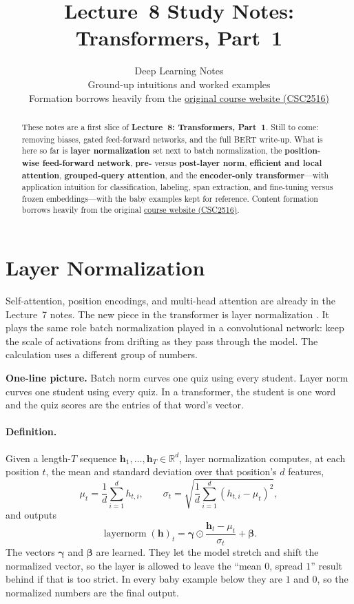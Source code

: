\documentclass[11pt]{article}
\title{Lecture~8 Study Notes:\\Transformers, Part~1}
\author{Deep Learning Notes\\
\small Ground-up intuitions and worked examples\\[0.35em]
\small Formation borrows heavily from the
\href{https://r-three.github.io/deep-learning-lecture-notes/lectures/08-transformers-part-1.html}{original course website (CSC2516)}}
\date{}
\begin{document}
\maketitle

\begin{abstract}
These notes are a first slice of \textbf{Lecture~8: Transformers, Part~1}.
Still to come: removing biases, gated feed-forward networks, and the full
BERT write-up. What is here so far is \textbf{layer normalization} set next
to batch normalization, the \textbf{position-wise feed-forward network},
\textbf{pre-} versus \textbf{post-layer norm}, \textbf{efficient and local
attention}, \textbf{grouped-query attention}, and the \textbf{encoder-only
transformer}---with application intuition for classification, labeling,
span extraction, and fine-tuning versus frozen embeddings---with the baby
examples kept for reference. Content formation borrows heavily
from the original
\href{https://r-three.github.io/deep-learning-lecture-notes/}{course website
(CSC2516)}.
\end{abstract}

\tableofcontents
\vspace{1em}

\section{Layer Normalization}

Self-attention, position encodings, and multi-head attention are already in
the Lecture~7 notes. The new piece in the transformer is layer
normalization \cite{ba2016layer}. It plays the same role batch normalization
played in a convolutional network: keep the scale of activations from
drifting as they pass through the model. The calculation uses a different
group of numbers.

\noindent\textbf{One-line picture.}
Batch norm curves one quiz using every student. Layer norm curves one
student using every quiz. In a transformer, the student is one word and the
quiz scores are the entries of that word's vector.

\paragraph{Definition.}
Given a length-\(T\) sequence \(\mathbf{h}_1,\ldots,\mathbf{h}_T\in\mathbb{R}^d\),
layer normalization computes, at each position \(t\), the mean and standard
deviation over that position's \(d\) features,
\[
  \mu_t
  =
  \frac{1}{d}\sum_{i=1}^{d} h_{t,i},
  \qquad
  \sigma_t
  =
  \sqrt{\frac{1}{d}\sum_{i=1}^{d}(h_{t,i}-\mu_t)^2},
\]
and outputs
\[
  \operatorname{layernorm}(\mathbf{h})_t
  =
  \boldsymbol{\gamma}
  \odot
  \frac{\mathbf{h}_t-\mu_t}{\sigma_t}
  +
  \boldsymbol{\beta}.
\]
The vectors \(\boldsymbol{\gamma}\) and \(\boldsymbol{\beta}\) are learned.
They let the model stretch and shift the normalized vector, so the layer is
allowed to leave the ``mean \(0\), spread \(1\)'' result behind if that is
too strict. In every baby example below they are \(1\) and \(0\), so the
normalized numbers are the final output.
\end{document}
